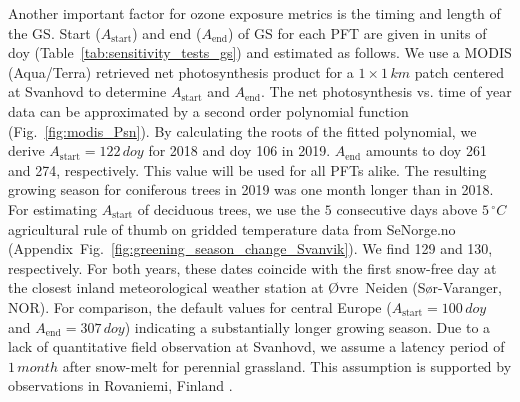 \documentclass[bg, manuscript]{copernicus}
\begin{document}
Another important factor for ozone exposure metrics is the timing and length of the GS. Start ($A_\text{start}$) and end ($A_\text{end}$) of GS for each PFT are given in units of \unit{doy} (Table~\ref{tab:sensitivity_tests_gs}) and estimated as follows. We use a MODIS (Aqua/Terra) retrieved net photosynthesis product for a $1\times 1\,\unit{km}$ patch centered at Svanhovd to determine $A_\text{start}$ and $A_\text{end}$. The net photosynthesis vs. time of year data can be approximated by a second order polynomial function (Fig.~\ref{fig:modis_Psn}). By calculating the roots of the fitted polynomial, we derive $A_\text{start} = 122\,\unit{doy}$ for 2018 and \unit{doy} 106 in 2019. $A_\text{end}$ amounts to \unit{doy} 261 and 274, respectively. This value will be used for all PFTs alike. The resulting growing season for coniferous trees in 2019 was one month longer than in 2018. For estimating $A_\text{start}$ of deciduous trees, we use the $5$ consecutive days above $5\,\unit{^\circ C}$ agricultural rule of thumb on gridded temperature data from SeNorge.no (Appendix~Fig.~\ref{fig:greening_season_change_Svanvik}). We find 129 and 130, respectively. For both years, these dates coincide with the first snow-free day at the closest inland meteorological weather station at Øvre~Neiden (Sør-Varanger, NOR).
For comparison, the default values for central Europe ($A_\mathrm{start} = 100\,\unit{doy}$ and $A_\mathrm{end} = 307\,\unit{doy}$) indicating a substantially longer growing season. Due to a lack of quantitative field observation at Svanhovd, we assume a latency period of $1\,\unit{month}$ after snow-melt for perennial grassland. This assumption is supported by observations in Rovaniemi, Finland \citep[][Supplement~Fig.~S1]{FCR:Korhonen2018}.
\end{document}
